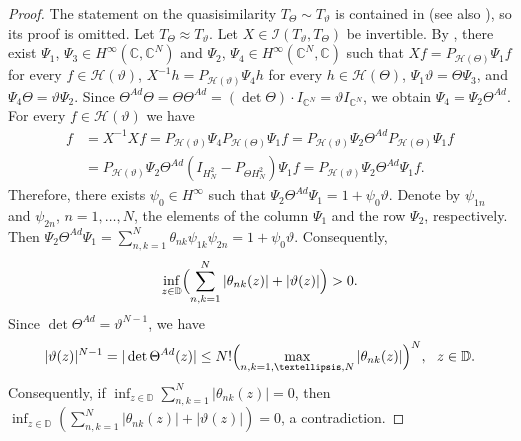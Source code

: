 \documentclass[a4paper,oneside,11pt]{amsart}
\numberwithin{equation}{section}
\theoremstyle{plain}
\theoremstyle{definition}
\begin{document}
\begin{proof} The statement on the quasisimilarity $T_\Theta\sim T_\vartheta$ is contained in {\cite[Theorem X.6.6]{sznfbk}} (see also {\cite[Proposition VI.5.11]{berc}}), 
so its proof is omitted. Let $T_\Theta\approx T_\vartheta$. Let $X\in\mathcal I(T_\vartheta,T_{\Theta})$ 
be  invertible. By {\cite[Theorem VI.3.6]{sznfbk}}, there exist
$\Psi_1$, $\Psi_3\in  H^\infty(\mathbb C,\mathbb C^N)$ and 
$\Psi_2$, $\Psi_4\in  H^\infty(\mathbb C^N,\mathbb C)$ 
such that $Xf=P_{\mathcal H(\Theta)}\Psi_1 f$
 for every $f \in\mathcal H(\vartheta)$, 
 $X^{-1}h=P_{\mathcal H(\vartheta)}\Psi_4 h$
 for every $h \in\mathcal H(\Theta)$, $\Psi_1\vartheta=\Theta\Psi_3$, and $\Psi_4\Theta=\vartheta\Psi_2$. 
Since $\Theta^{Ad}\Theta = \Theta\Theta^{Ad}=(\det\Theta)\cdot I_{\mathbb C^N}=\vartheta I_{\mathbb C^N}$, we obtain
  $\Psi_4=\Psi_2\Theta^{Ad}$. For every $f\in\mathcal H(\vartheta)$ we have  
\begin{align*} f&=X^{-1}Xf=P_{\mathcal H(\vartheta)}\Psi_4 P_{\mathcal H(\Theta)}\Psi_1 f=
P_{\mathcal H(\vartheta)}\Psi_2\Theta^{Ad} P_{\mathcal H(\Theta)}\Psi_1 f \\ &= 
P_{\mathcal H(\vartheta)}\Psi_2\Theta^{Ad}(I_{H^2_N}- P_{\Theta H^2_N})\Psi_1 f= 
P_{\mathcal H(\vartheta)}\Psi_2\Theta^{Ad}\Psi_1 f.
\end{align*}
Therefore, there exists $\psi_0\in H^\infty$ such that $\Psi_2\Theta^{Ad}\Psi_1=1+\psi_0\vartheta$. Denote by 
$\psi_{1n}$ and $\psi_{2n}$, $n=1,\ldots, N$, the elements of the column $\Psi_1$ and the row $\Psi_2$, respectively. 
Then  $\Psi_2\Theta^{Ad}\Psi_1=\sum_{n,k=1}^N\theta_{nk}\psi_{1k}\psi_{2n}=  1+\psi_0\vartheta$. Consequently, 
 \begin{equation*} \inf_{z\in\mathbb D}\Bigl(\sum_{n,k=1}^N|\theta_{nk}(z)|+|\vartheta(z)|\Bigr)>0.  
\end{equation*}
Since $\det\Theta^{Ad}=\vartheta^{N-1}$, we have 
 \begin{equation*} |\vartheta(z)|^{N-1}=|\det\Theta^{Ad}(z)|\leq N!\Bigl( \max_{n,k=1,\ldots, N}|\theta_{nk}(z)|\Bigr)^N, \ \ z\in\mathbb D. 
\end{equation*}
Consequently, if $ \inf_{z\in\mathbb D}\sum_{n,k=1}^N|\theta_{nk}(z)|=0$, then 
$\inf_{z\in\mathbb D}(\sum_{n,k=1}^N|\theta_{nk}(z)|+|\vartheta(z)|)=0$, a contradiction. 
\end{proof} 
\end{document}
